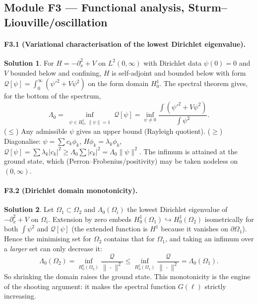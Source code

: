 \documentclass[11pt]{article}
\theoremstyle{definition}
\newtheorem*{sol}{Solution}
\begin{document}
\subsection*{Module F3 --- Functional analysis, Sturm--Liouville/oscillation}

\paragraph{F3.1 (Variational characterisation of the lowest Dirichlet eigenvalue).}
\begin{sol}
For $H=-\partial_x^2+V$ on $L^2(0,\infty)$ with Dirichlet data $\psi(0)=0$ and $V$ bounded below
and confining, $H$ is self-adjoint and bounded below with form
$\mathcal Q[\psi]=\int_0^\infty(\psi'^2+V\psi^2)$ on the form domain $H^1_0$. The spectral theorem
gives, for the bottom of the spectrum,
\[
\Lambda_0=\inf_{\substack{\psi\in H^1_0,\ \|\psi\|=1}}\mathcal Q[\psi]
=\inf_{\psi\neq0}\frac{\int(\psi'^2+V\psi^2)}{\int\psi^2}.
\]
($\le$) Any admissible $\psi$ gives an upper bound (Rayleigh quotient). ($\ge$) Diagonalise:
$\psi=\sum c_k\phi_k$, $H\phi_k=\lambda_k\phi_k$, $\mathcal Q[\psi]=\sum\lambda_k|c_k|^2\ge
\Lambda_0\sum|c_k|^2=\Lambda_0\|\psi\|^2$. The infimum is attained at the ground state, which
(Perron--Frobenius/positivity) may be taken nodeless on $(0,\infty)$.
\end{sol}

\paragraph{F3.2 (Dirichlet domain monotonicity).}
\begin{sol}
Let $\Omega_1\subset\Omega_2$ and $\Lambda_0(\Omega_i)$ the lowest Dirichlet eigenvalue of
$-\partial_x^2+V$ on $\Omega_i$. Extension by zero embeds $H^1_0(\Omega_1)\hookrightarrow
H^1_0(\Omega_2)$ isometrically for both $\int\psi^2$ and $\mathcal Q[\psi]$ (the extended
function is $H^1$ because it vanishes on $\partial\Omega_1$). Hence the minimising set for
$\Omega_2$ contains that for $\Omega_1$, and taking an infimum over a \emph{larger} set can only
decrease it:
\[
\Lambda_0(\Omega_2)=\inf_{H^1_0(\Omega_2)}\frac{\mathcal Q}{\|\cdot\|^2}
\le\inf_{H^1_0(\Omega_1)}\frac{\mathcal Q}{\|\cdot\|^2}=\Lambda_0(\Omega_1).
\]
So shrinking the domain raises the ground state. This monotonicity is the engine of the shooting
argument: it makes the spectral function $G(\ell)$ strictly increasing.
\end{sol}
\end{document}
